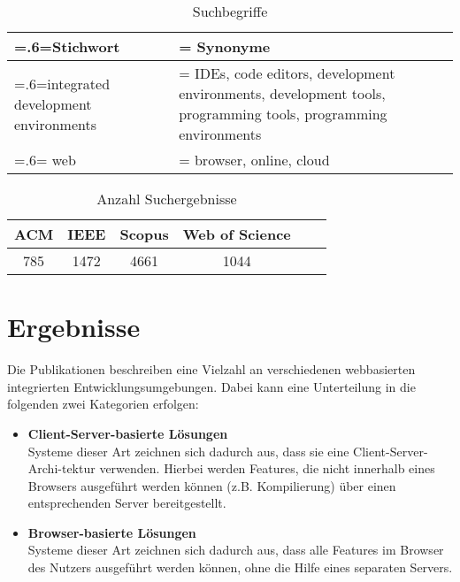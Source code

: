 \begin{table}[tbp]
    \centering
    \begin{tabularx}{\textwidth}{| >{\hsize=.6\hsize\linewidth=\hsize}X |
            >{\hsize=1.4\hsize\linewidth=\hsize}X |}
        \hline
        Stichwort                           & Synonyme                                                                                                     \\
        \hline
        integrated development environments & IDEs, code editors, development environments, development tools, programming tools, programming environments \\
        \hline
        web                                 & browser, online, cloud                                                                                       \\
        \hline
    \end{tabularx}
    \caption{Suchbegriffe}
    \label{table:search-terms}
\end{table}


\begin{table}[tbp]
    \centering
    \begin{tabular}{|c|c|c|c|c|c|}
        \hline
        ACM & IEEE & Scopus & Web of Science \\
        \hline
        785 & 1472 & 4661   & 1044           \\
        \hline
    \end{tabular}
    \caption{Anzahl Suchergebnisse}
    \label{table:amount-search-results}
\end{table}

\section{Ergebnisse}

Die Publikationen beschreiben eine Vielzahl an verschiedenen webbasierten integrierten Entwicklungsumgebungen. Dabei kann eine Unterteilung in die folgenden zwei Kategorien erfolgen:

\begin{itemize}
    \item \textbf{Client-Server-basierte Lösungen} \\
          Systeme dieser Art zeichnen sich dadurch aus, dass sie eine Client-Server-Archi-tektur verwenden. Hierbei werden Features, die nicht innerhalb eines Browsers ausgeführt werden können (z.B. Kompilierung) über einen entsprechenden Server bereitgestellt.
    \item \textbf{Browser-basierte Lösungen} \\
          Systeme dieser Art zeichnen sich dadurch aus, dass alle Features im Browser des Nutzers ausgeführt werden können, ohne die Hilfe eines separaten Servers.
\end{itemize}



